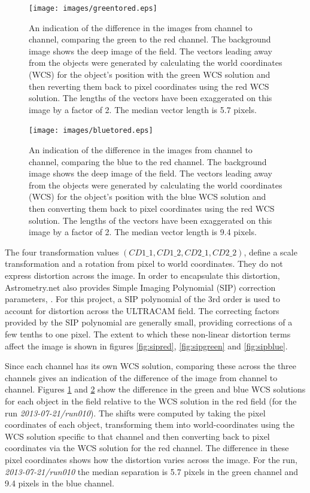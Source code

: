 \begin{figure}
  \centering
  \texttt{[image: images/greentored.eps]}
  \caption{An indication of the difference in the images from channel to channel,  comparing the green to the red channel. The background image shows the deep image of the field. The vectors leading away from the objects were generated by calculating the world coordinates (WCS) for the object's position with the green WCS solution and then reverting them back to pixel coordinates using the red WCS solution. The lengths of the vectors have been exaggerated on this image by a factor of 2. The median vector length is 5.7 pixels.}
\label{fig:greentored}
\end{figure}
  
\begin{figure}
  \centering
  \texttt{[image: images/bluetored.eps]}
  \caption{An indication of the difference in the images from channel to channel, comparing the blue to the red channel. The background image shows the deep image of the field. The vectors leading away from the objects were generated by calculating the world coordinates (WCS) for the object's position with the blue WCS solution and then converting them back to pixel coordinates using the red WCS solution. The lengths of the vectors have been exaggerated on this image by a factor of 2. The median vector length is 9.4 pixels.}
\label{fig:bluetored}
\end{figure}

The four transformation values $(CD1\_1, CD1\_2, CD2\_1, CD2\_2)$, define a scale transformation and a rotation from pixel to world coordinates. They do not express distortion across the image. In order to encapsulate this distortion, Astrometry.net also provides Simple Imaging Polynomial (SIP) correction parameters, \citep{sippolynomial}. For this project, a SIP polynomial of the 3rd order is used to account for distortion across the ULTRACAM field. The correcting factors provided by the SIP polynomial are generally small, providing corrections of a few tenths to one pixel. The extent to which these non-linear distortion terms affect the image is shown in figures \ref{fig:sipred}, \ref{fig:sipgreen} and \ref{fig:sipblue}. 

Since each channel has its own WCS solution, comparing these across the three channels gives an indication of the difference of the image from channel to channel. Figures \ref{fig:greentored} and \ref{fig:bluetored} show the difference in the green and blue WCS solutions for each object in the field relative to the WCS solution in the red field (for the run \emph{2013-07-21/run010}). The shifts were computed by taking the pixel coordinates of each object, transforming them into world-coordinates using the WCS solution specific to that channel and then converting back to pixel coordinates via the WCS solution for the red channel. The difference in these pixel coordinates shows how the distortion varies across the image.  For the run, \emph{2013-07-21/run010} the median separation is 5.7 pixels in the green channel and 9.4 pixels in the blue channel. 

